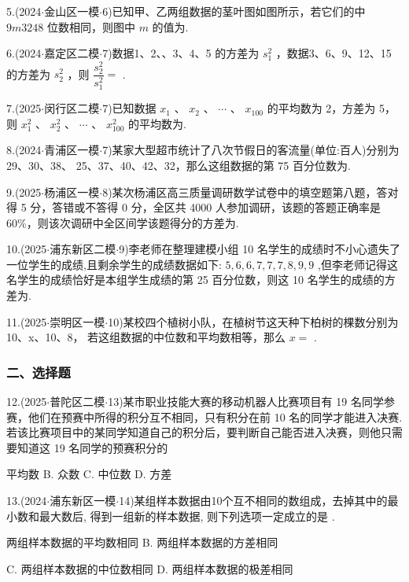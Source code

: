 5.(2024$\cdot$金山区一模$\cdot$6)已知甲、乙两组数据的茎叶图如图所示，若它们的中\blkda[2]{} $9m3248$ 位数相同，则图中 $m$ 的值为\blkda[2]{}.

6.(2024$\cdot$嘉定区二模$\cdot$7)数据1、2、、3、4、5 的方差为 ${s}_{1}^{2}$ ，数据3、6、9、12、15 的方差为 ${s}_{2}^{2}$ ，则 $\dfrac{{s}_{2}^{2}}{{s}_{1}^{2}} =$ \blkda[2]{}.

7.(2025$\cdot$闵行区二模$\cdot$7)已知数据 ${x}_{1}$ 、 ${x}_{2}$ 、 $\cdots$ 、 ${x}_{100}$ 的平均数为 2，方差为 5，则 ${x}_{1}^{2}$ 、 ${x}_{2}^{2}$ 、 $\cdots$ 、 ${x}_{100}^{2}$ 的平均数为\blkda[2]{}.

8.(2024$\cdot$青浦区一模$\cdot$7)某家大型超市统计了八次节假日的客流量(单位:百人)分别为29、30、38、 25、37、40、42、32，那么这组数据的第 75 百分位数为\blkda[2]{}.

9.(2025$\cdot$杨浦区一模$\cdot$8)某次杨浦区高三质量调研数学试卷中的填空题第八题，答对得 5 分，答错或不答得 0 分，全区共 4000 人参加调研，该题的答题正确率是 60\%，则该次调研中全区间学该题得分的方差为\blkda[2]{}.

10.(2025$\cdot$浦东新区二模$\cdot$9)李老师在整理建模小组 10 名学生的成绩时不小心遗失了一位学生的成绩,且剩余学生的成绩数据如下: $5,6,6,7,7,7,8,9,9$ ,但李老师记得这名学生的成绩恰好是本组学生成绩的第 25 百分位数，则这 10 名学生的成绩的方差为\blkda[2]{}.

11.(2025$\cdot$崇明区一模$\cdot$10)某校四个植树小队，在植树节这天种下柏树的棵数分别为10、x、10、8， 若这组数据的中位数和平均数相等，那么 $x =$ \blkda[2]{}.

\subsubsection*{二、选择题}

12.(2025$\cdot$普陀区二模$\cdot$13)某市职业技能大赛的移动机器人比赛项目有 19 名同学参赛，他们在预赛中所得的积分互不相同，只有积分在前 10 名的同学才能进入决赛. 若该比赛项目中的某同学知道自己的积分后，要判断自己能否进入决赛，则他只需要知道这 19 名同学的预赛积分的\blkda[2]{} \dotfill{(\kh{})}

\xx{}{}{}{}平均数 B. 众数 C. 中位数 D. 方差

13.(2024$\cdot$浦东新区一模$\cdot$14)某组样本数据由10个互不相同的数组成，去掉其中的最小数和最大数后, 得到一组新的样本数据, 则下列选项一定成立的是 \dotfill{(\kh{})}.

\xx{}{}{}{}两组样本数据的平均数相同 B. 两组样本数据的方差相同

C. 两组样本数据的中位数相同 D. 两组样本数据的极差相同

